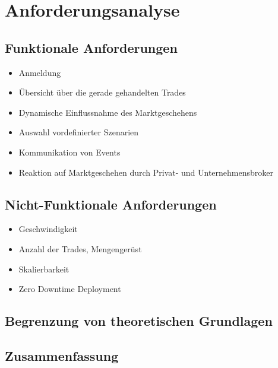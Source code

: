 \chapter{Anforderungsanalyse}

\section{Funktionale Anforderungen}
	\begin{itemize}
		\item Anmeldung
		\item Übersicht über die gerade gehandelten Trades
		\item Dynamische Einflussnahme des Marktgeschehens
		\item Auswahl vordefinierter Szenarien
		\item Kommunikation von Events
		\item Reaktion auf Marktgeschehen durch Privat- und Unternehmensbroker
	\end{itemize}
\section{Nicht-Funktionale Anforderungen}
		\begin{itemize}
		\item Geschwindigkeit
		\item Anzahl der Trades, Mengengerüst
		\item Skalierbarkeit
		\item Zero Downtime Deployment
	\end{itemize}
\section{Begrenzung von theoretischen Grundlagen}
\section{Zusammenfassung}